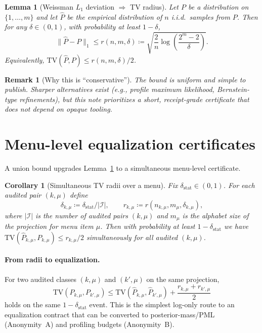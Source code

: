 \documentclass[11pt]{article}
\newtheorem{lemma}{Lemma}
\newtheorem{corollary}{Corollary}
\newtheorem{remark}{Remark}
\newcommand{\TV}{\mathrm{TV}}
\begin{document}
\begin{lemma}[Weissman $L_1$ deviation $\Rightarrow$ TV radius]\label{lem:weissman}
Let $P$ be a distribution on $\{1,\dots,m\}$ and let $\widehat P$ be the empirical distribution of $n$ i.i.d.\ samples from $P$.
Then for any $\delta\in(0,1)$, with probability at least $1-\delta$,
\[
\|\widehat P-P\|_1 \le r(n,m,\delta)\coloneqq \sqrt{\frac{2}{n}\log\!\left(\frac{2^m-2}{\delta}\right)}.
\]
Equivalently, $\TV(\widehat P,P)\le r(n,m,\delta)/2$.
\end{lemma}

\begin{remark}[Why this is ``conservative'']
The bound is uniform and simple to publish.
Sharper alternatives exist (e.g., profile maximum likelihood, Bernstein-type refinements),
but this note prioritizes a short, receipt-grade certificate that does not depend on opaque tooling.
\end{remark}

\section{Menu-level equalization certificates}
A union bound upgrades Lemma~\ref{lem:weissman} to a simultaneous menu-level certificate.

\begin{corollary}[Simultaneous TV radii over a menu]\label{cor:menu}
Fix $\delta_{\mathrm{stat}}\in(0,1)$.
For each audited pair $(k,\mu)$ define
\[
\delta_{k,\mu}\coloneqq \delta_{\mathrm{stat}} / |\mathcal I|,\qquad
r_{k,\mu}\coloneqq r(n_{k,\mu},m_\mu,\delta_{k,\mu}),
\]
where $|\mathcal I|$ is the number of audited pairs $(k,\mu)$ and $m_\mu$ is the alphabet size of the projection for menu item $\mu$.
Then with probability at least $1-\delta_{\mathrm{stat}}$ we have
$\TV(\widehat P_{k,\mu},P_{k,\mu})\le r_{k,\mu}/2$ simultaneously for all audited $(k,\mu)$.
\end{corollary}

\paragraph{From radii to equalization.}
For two audited classes $(k,\mu)$ and $(k',\mu)$ on the same projection,
\[
\TV(P_{k,\mu},P_{k',\mu})
\le
\TV(\widehat P_{k,\mu},\widehat P_{k',\mu}) + \frac{r_{k,\mu}+r_{k',\mu}}{2}
\]
holds on the same $1-\delta_{\mathrm{stat}}$ event.
This is the simplest log-only route to an equalization contract that can be converted to posterior-mass/PML (Anonymity~A) and profiling budgets (Anonymity~B). \cite{series:oddsinflation,series:profiling}
\end{document}
